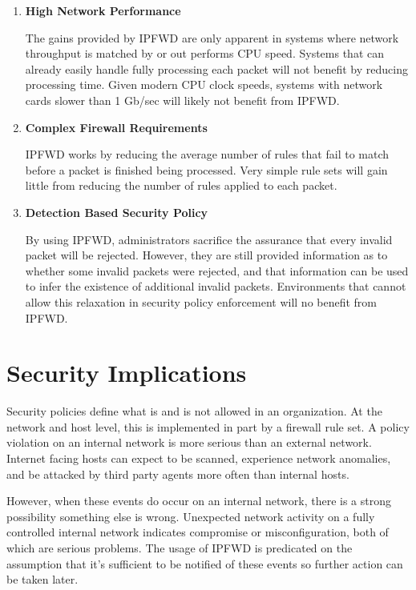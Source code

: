 \documentclass[journal]{IEEEtran}
\begin{document}
    \begin{enumerate}
      \item \textbf{High Network Performance}

        The gains provided by IPFWD are only apparent in systems where network
        throughput is matched by or out performs CPU speed. Systems that can
        already easily handle fully processing each packet will not benefit by
        reducing processing time. Given modern CPU clock speeds, systems with
        network cards slower than 1 Gb/sec will likely not benefit from IPFWD.

      \item \textbf{Complex Firewall Requirements}

        IPFWD works by reducing the average number of rules that fail to match
        before a packet is finished being processed. Very simple rule sets will
        gain little from reducing the number of rules applied to each packet.

      \item \textbf{Detection Based Security Policy}

        By using IPFWD, administrators sacrifice the assurance that every
        invalid packet will be rejected.  However, they are still provided
        information as to whether some invalid packets were rejected, and that
        information can be used to infer the existence of additional invalid
        packets. Environments that cannot allow this relaxation in security
        policy enforcement will no benefit from IPFWD.

    \end{enumerate}


\section{Security Implications} \label{securityimplications}

  Security policies define what is and is not allowed in an organization. At
  the network and host level, this is implemented in part by a firewall rule
  set. A policy violation on an internal network is more serious than an
  external network. Internet facing hosts can expect to be scanned, experience
  network anomalies, and be attacked by third party agents more often than
  internal hosts. 

  However, when these events do occur on an internal network, there is a strong
  possibility something else is wrong. Unexpected network activity on a fully
  controlled internal network indicates compromise or misconfiguration, both of
  which are serious problems. The usage of IPFWD is predicated on the
  assumption that it's sufficient to be notified of these events so further
  action can be taken later.
\end{document}
